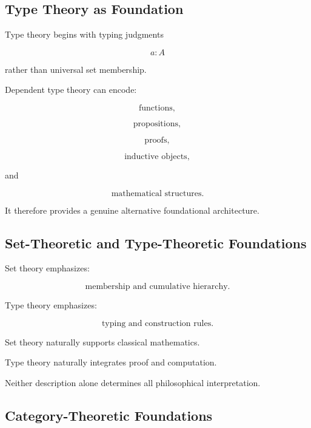 \subsection{Type Theory as Foundation}
\label{subsec:type-theory-as-foundation-philosophy}

Type theory begins with typing judgments

\[
\boxed{
a:A
}
\]

rather than universal set membership.

Dependent type theory can encode:

\[
\boxed{
\text{functions},
}
\]

\[
\boxed{
\text{propositions},
}
\]

\[
\boxed{
\text{proofs},
}
\]

\[
\boxed{
\text{inductive objects},
}
\]

and

\[
\boxed{
\text{mathematical structures}.
}
\]

It therefore provides a genuine alternative foundational architecture.

\subsection{Set-Theoretic and Type-Theoretic Foundations}
\label{subsec:set-vs-type-foundations}

Set theory emphasizes:

\[
\boxed{
\text{membership and cumulative hierarchy}.
}
\]

Type theory emphasizes:

\[
\boxed{
\text{typing and construction rules}.
}
\]

Set theory naturally supports classical mathematics.

Type theory naturally integrates proof and computation.

Neither description alone determines all philosophical interpretation.

\subsection{Category-Theoretic Foundations}
\label{subsec:category-theoretic-foundations}


